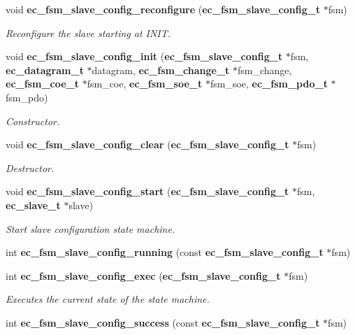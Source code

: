 \begin{DoxyCompactItemize}
void {\bf ec\-\_\-fsm\-\_\-slave\-\_\-config\-\_\-reconfigure} ({\bf ec\-\_\-fsm\-\_\-slave\-\_\-config\-\_\-t} $\ast$fsm)
\begin{DoxyCompactList}\small\item\em \-Reconfigure the slave starting at \-I\-N\-I\-T. \end{DoxyCompactList}\item 
void {\bf ec\-\_\-fsm\-\_\-slave\-\_\-config\-\_\-init} ({\bf ec\-\_\-fsm\-\_\-slave\-\_\-config\-\_\-t} $\ast$fsm, {\bf ec\-\_\-datagram\-\_\-t} $\ast$datagram, {\bf ec\-\_\-fsm\-\_\-change\-\_\-t} $\ast$fsm\-\_\-change, {\bf ec\-\_\-fsm\-\_\-coe\-\_\-t} $\ast$fsm\-\_\-coe, {\bf ec\-\_\-fsm\-\_\-soe\-\_\-t} $\ast$fsm\-\_\-soe, {\bf ec\-\_\-fsm\-\_\-pdo\-\_\-t} $\ast$fsm\-\_\-pdo)
\begin{DoxyCompactList}\small\item\em \-Constructor. \end{DoxyCompactList}\item 
void {\bf ec\-\_\-fsm\-\_\-slave\-\_\-config\-\_\-clear} ({\bf ec\-\_\-fsm\-\_\-slave\-\_\-config\-\_\-t} $\ast$fsm)
\begin{DoxyCompactList}\small\item\em \-Destructor. \end{DoxyCompactList}\item 
void {\bf ec\-\_\-fsm\-\_\-slave\-\_\-config\-\_\-start} ({\bf ec\-\_\-fsm\-\_\-slave\-\_\-config\-\_\-t} $\ast$fsm, {\bf ec\-\_\-slave\-\_\-t} $\ast$slave)
\begin{DoxyCompactList}\small\item\em \-Start slave configuration state machine. \end{DoxyCompactList}\item 
int {\bf ec\-\_\-fsm\-\_\-slave\-\_\-config\-\_\-running} (const {\bf ec\-\_\-fsm\-\_\-slave\-\_\-config\-\_\-t} $\ast$fsm)
\item 
int {\bf ec\-\_\-fsm\-\_\-slave\-\_\-config\-\_\-exec} ({\bf ec\-\_\-fsm\-\_\-slave\-\_\-config\-\_\-t} $\ast$fsm)
\begin{DoxyCompactList}\small\item\em \-Executes the current state of the state machine. \end{DoxyCompactList}\item 
int {\bf ec\-\_\-fsm\-\_\-slave\-\_\-config\-\_\-success} (const {\bf ec\-\_\-fsm\-\_\-slave\-\_\-config\-\_\-t} $\ast$fsm)
\end{DoxyCompactItemize}


